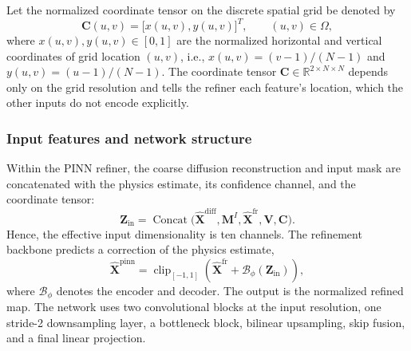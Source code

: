 \documentclass[lettersize,journal]{IEEEtran}
\newcommand{\mat}[1]{\mathbf{#1}}
\DeclareMathOperator{\Concat}{Concat}
\begin{document}
Let the normalized coordinate tensor on the discrete spatial grid be denoted by
\begin{equation}
	\mat{C}(u,v)=\big[x(u,v),y(u,v)\big]^T,
	\qquad (u,v)\in\Omega,
	\label{eq:coordinate_tensor}
\end{equation}
where $x(u,v),y(u,v)\in[0,1]$ are the normalized horizontal and vertical coordinates of grid location $(u,v)$, i.e., $x(u,v)=(v-1)/(N-1)$ and $y(u,v)=(u-1)/(N-1)$. The coordinate tensor $\mat{C}\in\mathbb{R}^{2\times N\times N}$ depends only on the grid resolution and tells the refiner each feature's location, which the other inputs do not encode explicitly.

\subsubsection{Input features and network structure}

Within the PINN refiner, the coarse diffusion reconstruction and input mask are concatenated with the physics estimate, its confidence channel, and the coordinate tensor:
\begin{equation}
    \mat{Z}_{\mathrm{in}}=\Concat\big(\widehat{\mat{X}}^{\mathrm{diff}},\mat{M}^{I},\widehat{\mat{X}}^{\mathrm{fr}},\mat{V},\mat{C}\big).
    \label{eq:pinn_input_tensor}
\end{equation}
Hence, the effective input dimensionality is ten channels. The refinement backbone predicts a correction of the physics estimate,
\begin{equation}
    \widehat{\mat{X}}^{\mathrm{pinn}}
    =\operatorname{clip}_{[-1,1]}\!\left(\widehat{\mat{X}}^{\mathrm{fr}}+\mathcal{B}_{\phi}(\mat{Z}_{\mathrm{in}})\right),
    \label{eq:pinn_backbone_map}
\end{equation}
where $\mathcal{B}_{\phi}$ denotes the encoder and decoder. The output is the normalized refined map. The network uses two convolutional blocks at the input resolution, one stride-2 downsampling layer, a bottleneck block, bilinear upsampling, skip fusion, and a final linear projection.
\end{document}
